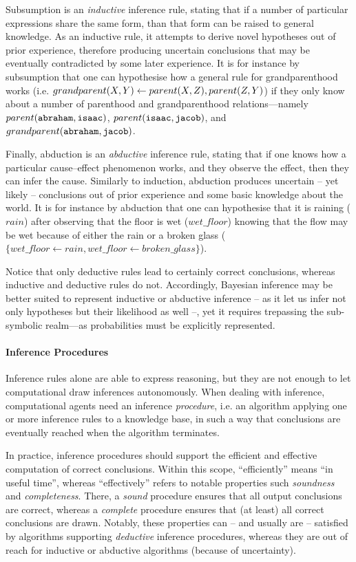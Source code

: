 \documentclass[12pt,a4paper,openright,twoside]{book}
\begin{document}
Subsumption is an \emph{inductive} inference rule, stating that if a number of particular expressions share the same form, than that form can be raised to general knowledge.
%
As an inductive rule, it attempts to derive novel hypotheses out of prior experience, therefore producing uncertain conclusions that may be eventually contradicted by some later experience.
%
It is for instance by subsumption that one can hypothesise how a general rule for grandparenthood works (i.e. $grand\-pa\-rent(X, Y) \leftarrow parent(X, Z), parent(Z, Y)$) if they only know about a number of parenthood and grandparenthood relations---namely $parent(\mathtt{abraham}, \mathtt{isaac})$, $parent(\mathtt{isaac}, \mathtt{jacob})$, and $grandparent(\mathtt{abraham}, \mathtt{jacob})$.

Finally, abduction is an \emph{abductive} inference rule, stating that if one knows how a particular cause--effect phenomenon works, and they observe the effect, then they can infer the cause.
%
Similarly to induction, abduction produces uncertain -- yet likely -- conclusions out of prior experience and some basic knowledge about the world.
%
It is for instance by abduction that one can hypothesise that it is raining ($rain$) after observing that the floor is wet ($wet\_floor$) knowing that the flow may be wet because of either the rain or a broken glass ($\{ wet\_floor \leftarrow rain, wet\_floor \leftarrow broken\_glass \}$).

Notice that only deductive rules lead to certainly correct conclusions, whereas inductive and deductive rules do not.
%
Accordingly, Bayesian inference may be better suited to represent inductive or abductive inference -- as it let us infer not only hypotheses but their likelihood as well --, yet it requires trepassing the sub-symbolic realm---as probabilities must be explicitly represented.

\paragraph{Inference Procedures}

Inference rules alone are able to express reasoning, but they are not enough to let computational draw inferences autonomously.
%
When dealing with inference, computational agents need an inference \emph{procedure}, i.e. an algorithm applying one or more inference rules to a knowledge base, in such a way that conclusions are eventually reached when the algorithm terminates.

In practice, inference procedures should support the efficient and effective computation of correct conclusions.
%
Within this scope, ``efficiently'' means ``in useful time'', whereas ``effectively'' refers to notable properties such \emph{soundness} and \emph{completeness}.
%
There, a \emph{sound} procedure ensures that all output conclusions are correct, whereas a \emph{complete} procedure ensures that (at least) all correct conclusions are drawn.
%
Notably, these properties can -- and usually are -- satisfied by algorithms supporting \emph{deductive} inference procedures, whereas they are out of reach for inductive or abductive algorithms (because of uncertainty).
\end{document}
